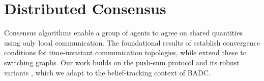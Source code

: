 \section{Distributed Consensus}

Consensus algorithms enable a group of agents to agree on shared quantities
using only local communication. The foundational results of
\citet{olfati2007consensus} establish convergence conditions for
time-invariant communication topologies, while \citet{ren2005consensus}
extend these to switching graphs. Our work builds on the push-sum protocol
\citep{kempe2003gossip} and its robust variants \citep{hadjicostis2017average},
which we adapt to the belief-tracking context of BADC.
